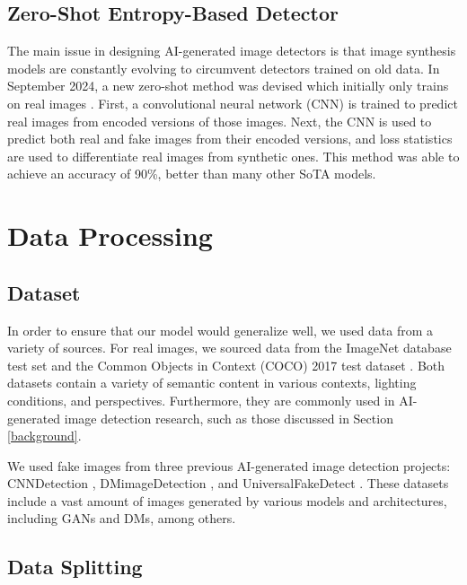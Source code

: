 \documentclass{article} %
\begin{document}
\subsection{Zero-Shot Entropy-Based Detector}
\label{ZED}

The main issue in designing AI-generated image detectors is that image synthesis models are constantly evolving to circumvent detectors trained on old data. In September 2024, a new zero-shot method was devised which initially only trains on real images \citep{cozzolino2024zeroshotdetectionaigeneratedimages}. First, a convolutional neural network (CNN) is trained to predict real images from encoded versions of those images. Next, the CNN is used to predict both real and fake images from their encoded versions, and loss statistics are used to differentiate real images from synthetic ones. This method was able to achieve an accuracy of 90\%, better than many other SoTA models.

\section{Data Processing}

\subsection{Dataset}

In order to ensure that our model would generalize well, we used data from a variety of sources. For real images, we sourced data from the ImageNet database test set \citep{5206848} and the Common Objects in Context (COCO) 2017 test dataset \citep{lin2015microsoft}. Both datasets contain a variety of semantic content in various contexts, lighting conditions, and perspectives. Furthermore, they are commonly used in AI-generated image detection research, such as those discussed in Section \ref{background}.

We used fake images from three previous AI-generated image detection projects: CNNDetection
\citep{wang2020cnngeneratedimagessurprisinglyeasy}, DMimageDetection \citep{corvi2022detectionsyntheticimagesgenerated}, and UniversalFakeDetect
\citep{ojha2024universalfakeimagedetectors}. These datasets include a vast amount of images generated by various models and architectures, including GANs and DMs, among others.

\subsection{Data Splitting}
\end{document}
